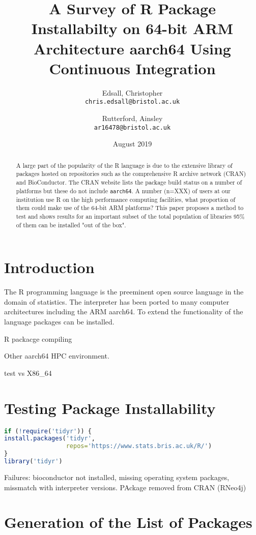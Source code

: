 \documentclass{article}
\title{A Survey of R Package Installabilty on 64-bit ARM Architecture aarch64 Using Continuous Integration}
\author{Edsall, Christopher\\
  \texttt{chris.edsall@bristol.ac.uk}
  \and
  Rutterford, Ainsley\\
  \texttt{ar16478@bristol.ac.uk}
}
\date{August 2019}
\begin{document}
\maketitle

\begin{abstract}
 A large part of the popularity of the R language is due to the extensive library of packages hosted on repositories such as the comprehensive R archive network (\textsc{CRAN}) and BioConductor. The \textsc{CRAN} website lists the package build status on a number of platforms but these do not include \texttt{aarch64}. A number (n=XXX) of users at our institution use R on the high performance computing facilities, what proportion of them could make use of the 64-bit ARM platforms? This paper proposes a method to test and shows results for an important subset of the total population of libraries 95\% of them can be installed "out of the box". 
\end{abstract}

\section{Introduction}

The R programming language\cite{R:Ihaka+Gentleman:1996} is the preeminent open source language in the domain of statistics\cite{muenchen2012popularity}. The interpreter has been ported to many computer architectures including the \textsc{ARM} aarch64. To extend the functionality of the language packages can be installed. 

R packacge compiling

Other aarch64 HPC environment.

test vs X86_64


\section{Testing Package Installability}

\begin{lstlisting}[language=R, caption=Testing that package \texttt{tidyr} can be installed and loaded]
if (!require('tidyr')) {
install.packages('tidyr',
                 repos='https://www.stats.bris.ac.uk/R/')
}
library('tidyr')
\end{lstlisting}

Failures: bioconductor not installed, missing operating system packages, missmatch with interpreter versions. PAckage removed from CRAN (RNeo4j)

\section{Generation of the List of Packages}
\end{document}
